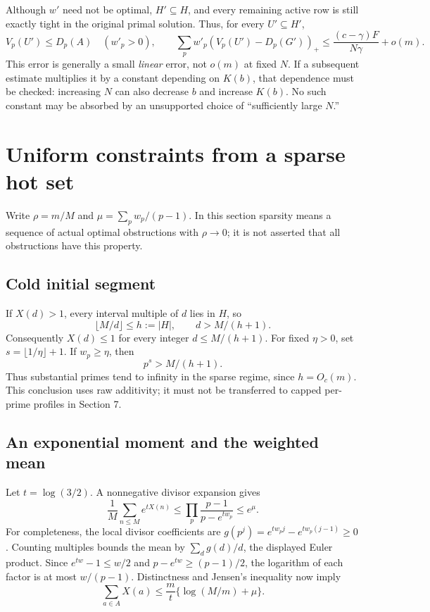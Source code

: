 \documentclass[11pt,a4paper]{article}
\theoremstyle{remark}\newtheorem{remark}[theorem]{Remark}
\newcommand{\pos}[1]{(#1)_+}
\begin{document}
Although \(w'\) need not be optimal, \(H'\subseteq H\), and every
remaining active row is still exactly tight in the original primal
solution. Thus, for every \(U'\subseteq H'\),
\begin{equation}
 V_p(U')\le D_p(A)\quad(w'_p>0),\qquad
 \sum_pw'_p\pos{V_p(U')-D_p(G')}
 \le \frac{(c-\gamma)F}{N\gamma}+o(m).\label{eq:aftergaprow}
\end{equation}
This error is generally a small \emph{linear} error, not \(o(m)\) at
fixed \(N\). If a subsequent estimate multiplies it by a constant
depending on \(K(b)\), that dependence must be checked: increasing
\(N\) can also decrease \(b\) and increase \(K(b)\). No such constant
may be absorbed by an unsupported choice of ``sufficiently large
\(N\).''

\section{Uniform constraints from a sparse hot set}

Write \(\rho=m/M\) and
\(\mu=\sum_p w_p/(p-1)\). In this section sparsity means a sequence of
actual optimal obstructions with \(\rho\to0\); it is not asserted that
all obstructions have this property.

\subsection{Cold initial segment}

If \(X(d)>1\), every interval multiple of \(d\) lies in \(H\), so
\[
 \lfloor M/d\rfloor\le h:=|H|,\qquad d>M/(h+1).
\]
Consequently \(X(d)\le1\) for every integer \(d\le M/(h+1)\).
For fixed \(\eta>0\), set \(s=\lfloor1/\eta\rfloor+1\). If
\(w_p\ge\eta\), then
\begin{equation}
 p^s>M/(h+1).\label{eq:coldprime}
\end{equation}
Thus substantial primes tend to infinity in the sparse regime, since
\(h=O_c(m)\). This conclusion uses raw additivity; it must not be
transferred to capped per-prime profiles in Section 7.

\subsection{An exponential moment and the weighted mean}

Let \(t=\log(3/2)\). A nonnegative divisor expansion gives
\begin{equation}
 \frac1M\sum_{n\le M}e^{tX(n)}
 \le\prod_p\frac{p-1}{p-e^{tw_p}}\le e^\mu.
 \label{eq:expmoment}
\end{equation}
For completeness, the local divisor coefficients are
\(g(p^j)=e^{tw_pj}-e^{tw_p(j-1)}\ge0\). Counting multiples bounds the
mean by \(\sum_dg(d)/d\), the displayed Euler product. Since
\(e^{tw}-1\le w/2\) and
\(p-e^{tw}\ge(p-1)/2\), the logarithm of each factor is at most
\(w/(p-1)\).
Distinctness and Jensen's inequality now imply
\begin{equation}
 \sum_{a\in A}X(a)\le\frac m t\{\log(M/m)+\mu\}.
 \label{eq:actualjensen}
\end{equation}
\end{document}
